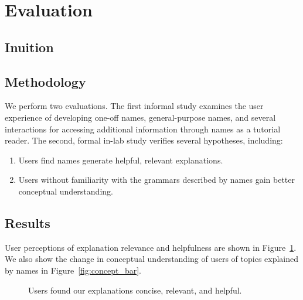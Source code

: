 \section{Evaluation}

\subsection{Inuition}

\subsection{Methodology}

We perform two evaluations.
The first informal study examines the user experience of developing one-off \glspl{name}, general-purpose \glspl{name}, and several interactions for accessing additional information through \glspl{name} as a tutorial reader.
The second, formal in-lab study verifies several hypotheses, including:
\noindent
\begin{enumerate}%
\item Users find \glspl{name} generate helpful, relevant explanations.
\item Users without familiarity with the grammars described by \glspl{name} gain better conceptual understanding.
\end{enumerate}

\subsection{Results}

User perceptions of explanation relevance and helpfulness are shown in Figure~\ref{fig:user_study_bar}.
We also show the change in conceptual understanding of users of topics explained by \glspl{name} in Figure~\ref{fig:concept_bar}.

\begin{figure}
\caption{Users found our explanations concise, relevant, and helpful.}
\label{fig:user_study_bar}
\end{figure}
